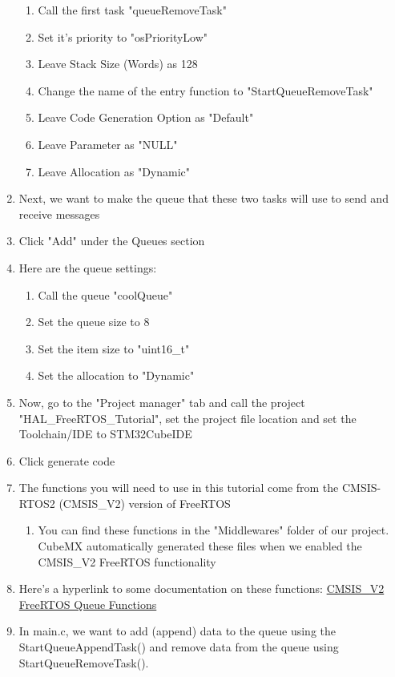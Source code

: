 \begin{enumerate}
    \begin{enumerate}
        \item Call the first task "queueRemoveTask"
        \item Set it's priority to "osPriorityLow"
        \item Leave Stack Size (Words) as 128
        \item Change the name of the entry function to "StartQueueRemoveTask"
        \item Leave Code Generation Option as "Default"
        \item Leave Parameter as "NULL"
        \item Leave Allocation as "Dynamic"
    \end{enumerate}
    \item Next, we want to make the queue that these two tasks will use to send and receive messages
    \item Click "Add" under the Queues section
    \item Here are the queue settings:
    \begin{enumerate}
        \item Call the queue "coolQueue"
        \item Set the queue size to 8
        \item Set the item size to "uint16\_t"
        \item Set the allocation to "Dynamic"
    \end{enumerate}
    \item Now, go to the "Project manager" tab and call the project "HAL\_FreeRTOS\_Tutorial", set the project file location and set the Toolchain/IDE to STM32CubeIDE
    \item Click generate code
    \item The functions you will need to use in this tutorial come from the CMSIS-RTOS2 (CMSIS\_V2) version of FreeRTOS
    \begin{enumerate}
        \item You can find these functions in the "Middlewares" folder of our project. CubeMX automatically generated these files when we enabled the CMSIS\_V2 FreeRTOS functionality
    \end{enumerate}
    \item Here's a hyperlink to some documentation on these functions: \href{https://www.keil.com/pack/doc/CMSIS_Dev/RTOS2/html/group__CMSIS__RTOS__Message.html}{CMSIS\_V2 FreeRTOS Queue Functions}
    \item In main.c, we want to add (append) data to the queue using the StartQueueAppendTask() and remove data from the queue using StartQueueRemoveTask().

\end{enumerate}
